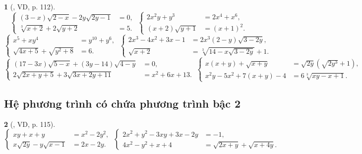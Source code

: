 \documentclass{article}
\newtheorem{baitoan}{}
\begin{document}
\begin{baitoan}[\cite{Kien_dai_so_9}, VD, p. 112]
	\begin{equation*}
		\left\{\begin{split}
			(3 - x)\sqrt{2 - x} - 2y\sqrt{2y - 1} &= 0,\\
			\sqrt[3]{x + 2} + 2\sqrt{y + 2} &= 5.
		\end{split}\right.\ \left\{\begin{split}
			2x^2y + y^3 &= 2x^4 + x^6,\\
			(x + 2)\sqrt{y + 1} &= (x + 1)^2.
		\end{split}\right.
	\end{equation*}
	\begin{equation*}
		\left\{\begin{split}
			x^5 + xy^4 &= y^{10} + y^6,\\
			\sqrt{4x + 5} + \sqrt{y^2 + 8} &= 6.
		\end{split}\right.\
		\left\{\begin{split}
			2x^3 - 4x^2 + 3x - 1 &= 2x^3(2 - y)\sqrt{3 - 2y},\\
			\sqrt{x + 2} &= \sqrt[3]{14 - x\sqrt{3 - 2y}} + 1.
		\end{split}\right.
	\end{equation*}
	\begin{equation*}
		\left\{\begin{split}
			(17 - 3x)\sqrt{5 - x} + (3y - 14)\sqrt{4 - y} &= 0,\\
			2\sqrt{2x + y + 5} + 3\sqrt{3x + 2y + 11} &= x^2 + 6x + 13.
		\end{split}\right.\ \left\{\begin{split}
			x(x + y) + \sqrt{x + y} &= \sqrt{2y}(\sqrt{2y^3} + 1),\\
			x^2y - 5x^2 + 7(x + y) - 4 &= 6\sqrt[3]{xy - x + 1}.
		\end{split}\right.
	\end{equation*}
\end{baitoan}

\subsection{Hệ phương trình có chứa phương trình bậc 2}

\begin{baitoan}[\cite{Kien_dai_so_9}, VD, p. 115]
	\begin{equation*}
		\left\{\begin{split}
			xy + x + y &= x^2 - 2y^2,\\
			x\sqrt{2y} - y\sqrt{x - 1} &= 2x - 2y.
		\end{split}\right.\ \left\{\begin{split}
			2x^2 + y^2 - 3xy + 3x - 2y &= -1,\\
			4x^2 - y^2 + x + 4 &= \sqrt{2x + y} + \sqrt{x + 4y}.
		\end{split}\right.
	\end{equation*}
\end{baitoan}
\end{document}

